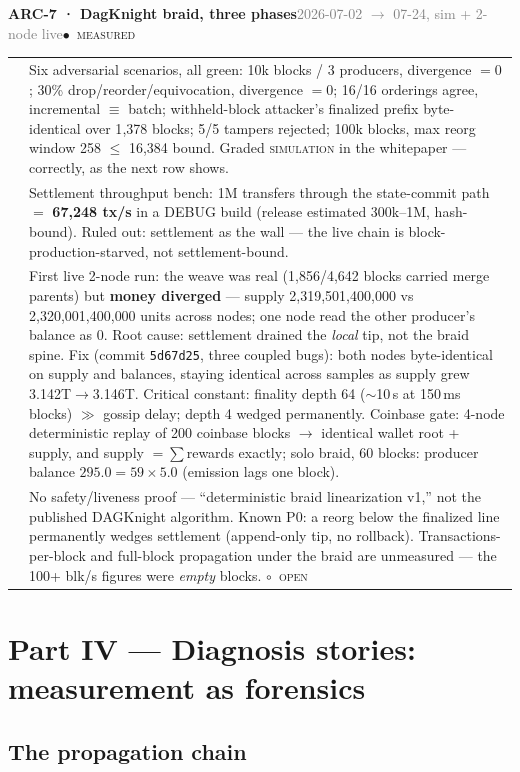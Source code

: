 \documentclass[10pt,a4paper]{article}
\makeatletter
\newcommand{\stM}{\textcolor{sigilcyan}{$\bullet$}~{\scriptsize\textcolor{sigilcyan}{\textsc{measured}}}}
\newcommand{\stO}{\textcolor{sigilamber}{$\circ$}~{\scriptsize\textcolor{sigilamber}{\textsc{open}}}}
\newcommand{\measured}[1]{\textcolor{sigilcyan}{\textbf{#1}}}
\newcommand{\frow}[2]{{\footnotesize\textcolor{gray}{\textsc{#1}}}\;&\small #2\\}
\newenvironment{mentry}[4]{%
\begin{tcolorbox}[enhanced,breakable,colback=white,colframe=slate,boxrule=0.6pt,arc=2pt,
  left=8pt,right=8pt,top=6pt,bottom=6pt,
  borderline west={3pt}{0pt}{sigilcyan!70!slate}]
{\small\textbf{#1 · #2}\hfill{\footnotesize\textcolor{gray}{#3}}\quad#4}\\[4pt]
\begin{tabular}{@{}>{\raggedleft\arraybackslash}p{1.8cm}p{13.2cm}@{}}
}{%
\end{tabular}
\end{tcolorbox}\vspace{2pt}}
\makeatother
\begin{document}
\begin{mentry}{ARC-7}{DagKnight braid, three phases}{2026-07-02 $\to$ 07-24, sim + 2-node live}{\stM}
\frow{sim gate}{Six adversarial scenarios, all green: 10k blocks / 3 producers,
divergence $=0$; 30\% drop/reorder/equivocation, divergence $=0$; 16/16 orderings agree,
incremental $\equiv$ batch; withheld-block attacker's finalized prefix byte-identical over
1{,}378 blocks; 5/5 tampers rejected; 100k blocks, max reorg window 258 $\le$ 16{,}384
bound. Graded \textsc{simulation} in the whitepaper --- correctly, as the next row shows.}
\frow{settle}{Settlement throughput bench: 1M transfers through the state-commit path
$=$ \measured{67{,}248 tx/s} in a DEBUG build (release estimated 300k--1M, hash-bound).
Ruled out: settlement as the wall --- the live chain is block-production-starved, not
settlement-bound.}
\frow{live}{First live 2-node run: the weave was real (1{,}856/4{,}642 blocks carried
merge parents) but \textbf{money diverged} --- supply 2{,}319{,}501{,}400{,}000 vs
2{,}320{,}001{,}400{,}000 units across nodes; one node read the other producer's balance
as 0. Root cause: settlement drained the \emph{local} tip, not the braid spine. Fix
(commit \texttt{5d67d25}, three coupled bugs): both nodes byte-identical on supply and
balances, staying identical across samples as supply grew 3.142T$\to$3.146T. Critical
constant: finality depth 64 ($\sim$10\,s at 150\,ms blocks) $\gg$ gossip delay; depth 4
wedged permanently. Coinbase gate: 4-node deterministic replay of 200 coinbase blocks
$\to$ identical wallet root + supply, and supply $=\sum$rewards exactly; solo braid, 60
blocks: producer balance $295.0 = 59\times5.0$ (emission lags one block).}
\frow{open}{No safety/liveness proof --- ``deterministic braid linearization v1,'' not
the published DAGKnight algorithm. Known P0: a reorg below the finalized line permanently
wedges settlement (append-only tip, no rollback). Transactions-per-block and full-block
propagation under the braid are unmeasured --- the 100+ blk/s figures were \emph{empty}
blocks. \stO}
\end{mentry}

\section{Part IV --- Diagnosis stories: measurement as forensics}
\label{sec:forensics}

\subsection{The propagation chain}
\end{document}
